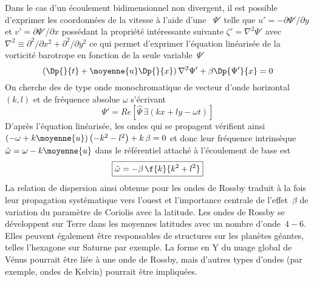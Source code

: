 \sk
Dans le cas d'un écoulement bidimensionnel non divergent,
il est possible d'exprimer les coordonnées de la vitesse
à l'aide d'une ~$\Psi'$ telle que
$u' = - \partial \Psi' / \partial y$ et $v' = \partial \Psi' / \partial x$
\noindent possédant la propriété intéressante suivante
$\zeta' = \nabla^2 \Psi'$ avec 
$\nabla^2 \equiv 
\partial^2 / \partial x^2 
+
\partial^2 / \partial y^2$
ce qui permet d'exprimer l'équation linéarisée de la vorticité barotrope
en fonction de la seule variable~$\Psi'$
\[
\left( \Dp{}{t} + \moyenne{u} \Dp{}{x} \right) \nabla^2 \Psi' + \beta \Dp{\Psi'}{x} = 0
\]
\noindent On cherche des 
de type onde monochromatique 
de vecteur d'onde horizontal~$(k,l)$ 
et de fréquence absolue $\omega$
s'écrivant
\[
\Psi' = Re \left[ \hat{\Psi} \, \exi{(kx+ly-\omega t)} \right]
\]
\noindent D'après l'équation linéarisée, les ondes
qui se propagent vérifient ainsi
$ \left( - \omega + k \moyenne{u} \right) \left( - k^2 - l^2 \right) + k\,\beta = 0 $
et donc leur fréquence intrinsèque~$\tilde{\omega} = \omega - k\moyenne{u}$ 
dans le référentiel attaché à l'écoulement de base est
\[
\boxed{
\tilde{\omega} = - \beta \, \f{k}{k^2+l^2}
}
\]
\noindent La relation de dispersion ainsi obtenue pour
les ondes de Rossby traduit à la fois leur
propagation systématique vers l'ouest
et l'importance centrale de l'effet~$\beta$ 
de variation du paramètre de Coriolis avec la latitude.
%
Les ondes de Rossby se développent sur Terre
dans les moyennes latitudes avec un nombre d'onde~$4-6$.
Elles peuvent également être responsables de structures 
sur les planètes géantes, telles l'hexagone sur Saturne par exemple.
La forme en Y du nuage global de Vénus pourrait être liée
à une onde de Rossby, mais d'autres types d'ondes 
(par exemple, ondes de Kelvin) pourrait être impliquées.
